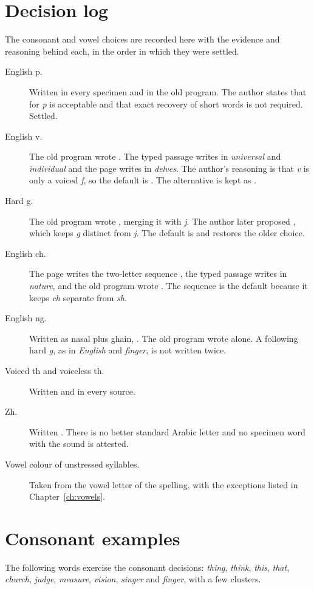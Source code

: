 \section{Decision log}
The consonant and vowel choices are recorded here with the evidence and reasoning behind each, in the order in which they were settled.

\begin{description}
\item[English p.] Written  in every specimen and in the old program. The author states that  for \emph{p} is acceptable and that exact recovery of short words is not required. Settled.
\item[English v.] The old program wrote . The typed passage writes  in \emph{universal} and \emph{individual} and the page writes  in \emph{delves}. The author's reasoning is that \emph{v} is only a voiced \emph{f}, so the default is . The alternative is kept as .
\item[Hard g.] The old program wrote , merging it with \emph{j}. The author later proposed , which keeps \emph{g} distinct from \emph{j}. The default is  and  restores the older choice.
\item[English ch.] The page writes the two-letter sequence , the typed passage writes  in \emph{nature}, and the old program wrote . The sequence is the default because it keeps \emph{ch} separate from \emph{sh}.
\item[English ng.] Written as nasal plus ghain, . The old program wrote  alone. A following hard \emph{g}, as in \emph{English} and \emph{finger}, is not written twice.
\item[Voiced th and voiceless th.] Written  and  in every source.
\item[Zh.] Written . There is no better standard Arabic letter and no specimen word with the sound is attested.
\item[Vowel colour of unstressed syllables.] Taken from the vowel letter of the spelling, with the exceptions listed in Chapter~\ref{ch:vowels}.
\end{description}

\section{Consonant examples}
The following words exercise the consonant decisions: \emph{thing}, \emph{think}, \emph{this}, \emph{that}, \emph{church}, \emph{judge}, \emph{measure}, \emph{vision}, \emph{singer} and \emph{finger}, with a few clusters.

